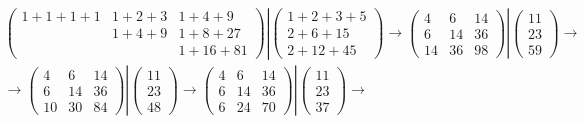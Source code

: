 \documentclass[12pt]{article}
\begin{document}
    \begin{gather*}
        \begin{pmatrix}
            1 + 1 + 1 + 1 & 1 + 2 + 3 & 1 + 4 + 9   \\
            & 1 + 4 + 9 & 1 + 8 + 27  \\
            &           & 1 + 16 + 81
        \end{pmatrix}
        \left |
        \begin{pmatrix}
            1 + 2 + 3 + 5 \\
            2 + 6 + 15    \\
            2 + 12 + 45
        \end{pmatrix}
        \right .
        \rightarrow
        \begin{pmatrix}
            4  & 6  & 14 \\
            6  & 14 & 36 \\
            14 & 36 & 98
        \end{pmatrix}
        \left |
        \begin{pmatrix}
            11 \\
            23 \\
            59
        \end{pmatrix}
        \right .
        \rightarrow \\
        \rightarrow
        \begin{pmatrix}
            4  & 6  & 14 \\
            6  & 14 & 36 \\
            10 & 30 & 84
        \end{pmatrix}
        \left |
        \begin{pmatrix}
            11 \\
            23 \\
            48
        \end{pmatrix}
        \right .
        \rightarrow
        \begin{pmatrix}
            4 & 6  & 14 \\
            6 & 14 & 36 \\
            6 & 24 & 70
        \end{pmatrix}
        \left |
        \begin{pmatrix}
            11 \\
            23 \\
            37
        \end{pmatrix}
        \right .
        \rightarrow

\end{gather*}
\end{document}

